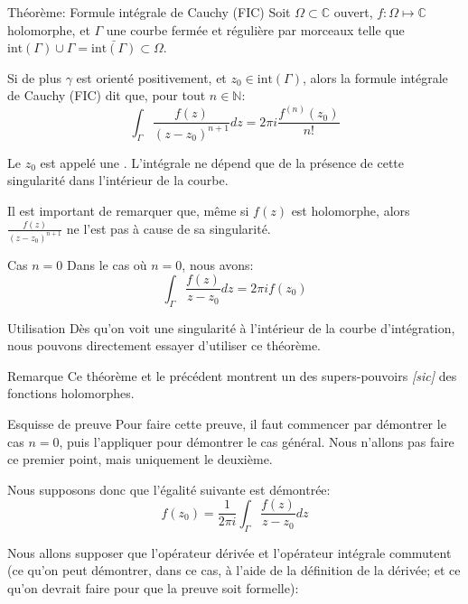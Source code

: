 \documentclass[a4paper]{article}
\begin{document}
\begin{parag}{Théorème: Formule intégrale de Cauchy (FIC)}
    Soit $\Omega \subset \mathbb{C}$ ouvert, $f: \Omega \mapsto \mathbb{C}$ holomorphe, et $\Gamma$ une courbe fermée et régulière par morceaux telle que $\text{int}\left(\Gamma\right) \cup \Gamma = \bar{\text{int}\left(\Gamma\right)} \subset \Omega$.

    Si de plus $\gamma$ est orienté positivement, et $z_0 \in \text{int}\left(\Gamma\right)$, alors la formule intégrale de Cauchy (FIC) dit que, pour tout $n \in \mathbb{N}$:
    \[\int_{\Gamma} \frac{f\left(z\right)}{\left(z - z_0\right)^{n+1}} dz = 2\pi i \frac{f^{\left(n\right)}\left(z_0\right)}{n!}\]

    Le $z_0$ est appelé une . L'intégrale ne dépend que de la présence de cette singularité dans l'intérieur de la courbe.

    Il est important de remarquer que, même si $f\left(z\right)$ est holomorphe, alors $\frac{f\left(z\right)}{\left(z - z_0\right)^{n+1}}$ ne l'est pas à cause de sa singularité.

    \begin{subparag}{Cas $n = 0$}
        Dans le cas où $n = 0$, nous avons:
        \[\int_{\Gamma} \frac{f\left(z\right)}{z-z_0}dz = 2\pi i f\left(z_0\right)\]
    \end{subparag}

    \begin{subparag}{Utilisation}
        Dès qu'on voit une singularité à l'intérieur de la courbe d'intégration, nous pouvons directement essayer d'utiliser ce théorème.
    \end{subparag}

    \begin{subparag}{Remarque}
        Ce théorème et le précédent montrent un des supers-pouvoirs \textit{[sic]} des fonctions holomorphes.
    \end{subparag}

    \begin{subparag}{Esquisse de preuve}
        Pour faire cette preuve, il faut commencer par démontrer le cas $n = 0$, puis l'appliquer pour démontrer le cas général. Nous n'allons pas faire ce premier point, mais uniquement le deuxième. \frownie

        Nous supposons donc que l'égalité suivante est démontrée: 
        \[f\left(z_0\right) = \frac{1}{2\pi i} \int_{\Gamma} \frac{f\left(z\right)}{z - z_0} dz\]

        Nous allons supposer que l'opérateur dérivée et l'opérateur intégrale commutent (ce qu'on peut démontrer, dans ce cas, à l'aide de la définition de la dérivée; et ce qu'on devrait faire pour que la preuve soit formelle): 
        

\end{subparag}
\end{parag}
\end{document}
